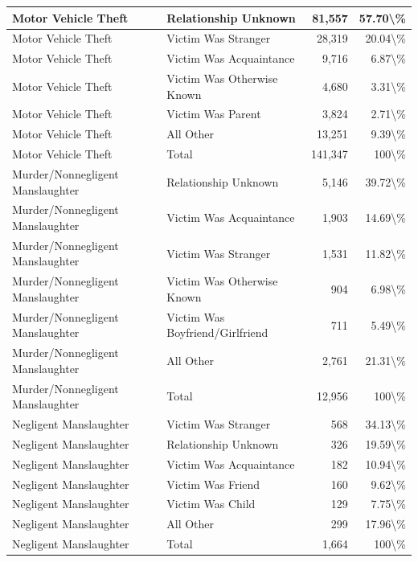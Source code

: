 \documentclass[
]{krantz}
\begin{document}
\begin{longtable}[t]{l|l|r|r}
\hline
Motor Vehicle Theft & Relationship Unknown & 81,557 & 57.70\textbackslash{}\%\\
\hline
Motor Vehicle Theft & Victim Was Stranger & 28,319 & 20.04\textbackslash{}\%\\
\hline
Motor Vehicle Theft & Victim Was Acquaintance & 9,716 & 6.87\textbackslash{}\%\\
\hline
Motor Vehicle Theft & Victim Was Otherwise Known & 4,680 & 3.31\textbackslash{}\%\\
\hline
Motor Vehicle Theft & Victim Was Parent & 3,824 & 2.71\textbackslash{}\%\\
\hline
Motor Vehicle Theft & All Other & 13,251 & 9.39\textbackslash{}\%\\
\hline
Motor Vehicle Theft & Total & 141,347 & 100\textbackslash{}\%\\
\hline
Murder/Nonnegligent Manslaughter & Relationship Unknown & 5,146 & 39.72\textbackslash{}\%\\
\hline
Murder/Nonnegligent Manslaughter & Victim Was Acquaintance & 1,903 & 14.69\textbackslash{}\%\\
\hline
Murder/Nonnegligent Manslaughter & Victim Was Stranger & 1,531 & 11.82\textbackslash{}\%\\
\hline
Murder/Nonnegligent Manslaughter & Victim Was Otherwise Known & 904 & 6.98\textbackslash{}\%\\
\hline
Murder/Nonnegligent Manslaughter & Victim Was Boyfriend/Girlfriend & 711 & 5.49\textbackslash{}\%\\
\hline
Murder/Nonnegligent Manslaughter & All Other & 2,761 & 21.31\textbackslash{}\%\\
\hline
Murder/Nonnegligent Manslaughter & Total & 12,956 & 100\textbackslash{}\%\\
\hline
Negligent Manslaughter & Victim Was Stranger & 568 & 34.13\textbackslash{}\%\\
\hline
Negligent Manslaughter & Relationship Unknown & 326 & 19.59\textbackslash{}\%\\
\hline
Negligent Manslaughter & Victim Was Acquaintance & 182 & 10.94\textbackslash{}\%\\
\hline
Negligent Manslaughter & Victim Was Friend & 160 & 9.62\textbackslash{}\%\\
\hline
Negligent Manslaughter & Victim Was Child & 129 & 7.75\textbackslash{}\%\\
\hline
Negligent Manslaughter & All Other & 299 & 17.96\textbackslash{}\%\\
\hline
Negligent Manslaughter & Total & 1,664 & 100\textbackslash{}\%\\

\end{longtable}
\end{document}
